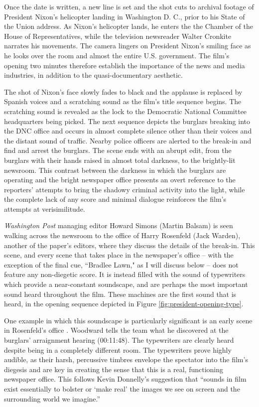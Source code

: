 Once the date is written, a new line is set and the shot cuts to archival footage of President Nixon's helicopter landing in Washington D. C., prior to his State of the Union address.
As Nixon's helicopter lands, he enters the the Chamber of the House of Representatives, while the television newsreader Walter Cronkite narrates his movements.
The camera lingers on President Nixon's smiling face as he looks over the room and almost the entire U.S. government.
The film's opening two minutes therefore establish the importance of the news and media industries, in addition to the quasi-documentary aesthetic.

The shot of Nixon's face slowly fades to black and the applause is replaced by Spanish voices and a scratching sound as the film's title sequence begins.
The scratching sound is revealed as the lock to the Democratic National Committee headquarters being picked.
The next sequence depicts the burglars breaking into the DNC office and occurs in almost complete silence other than their voices and the distant sound of traffic.
Nearby police officers are alerted to the break-in and find and arrest the burglars.
The scene ends with an abrupt edit, from the burglars with their hands raised in almost total darkness, to the brightly-lit newsroom.
This contrast between the darkness in which the burglars are operating and the bright newspaper office presents an overt reference to the reporters' attempts to bring the shadowy criminal activity into the light, while the complete lack of any score and minimal dialogue reinforces the film's attempts at verisimilitude. 

\textit{Washington Post} managing editor Howard Simons (Martin Balsam) is seen walking across the newsroom to the office of Harry Rosenfeld (Jack Warden), another of the paper's editors, where they discuss the details of the break-in.
This scene, and every scene that takes place in the newspaper's office – with the exception of the final cue, ``Bradlee Lawn," as I will discuss below – does not feature any non-diegetic score.
It is instead filled with the sound of typewriters which provide a near-constant soundscape, and are perhaps the most important sound heard throughout the film.
These machines are the first sound that is heard, in the opening sequence depicted in Figure \ref{fig:president-opening-type}.

One example in which this soundscape is particularly significant is an early scene in Rosenfeld's office .
Woodward tells the team what he discovered at the burglars’ arraignment hearing (00:11:48).
The typewriters are clearly heard despite being in a completely different room.
The typewriters prove highly audible, as their harsh, percussive timbres envelope the spectator into the film’s diegesis and are key in creating the sense that this is a real, functioning newspaper office.
This follows Kevin Donnelly’s suggestion that ``sounds in film exist essentially to bolster or `make real’ the images we see on screen and the surrounding world we imagine.”\autocites[][108]{buckland_saw_2009}

